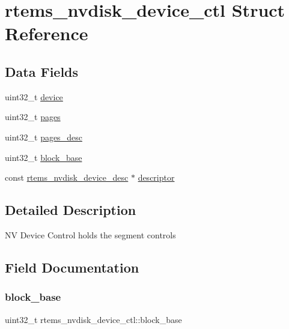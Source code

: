 \hypertarget{structrtems__nvdisk__device__ctl}{}\section{rtems\+\_\+nvdisk\+\_\+device\+\_\+ctl Struct Reference}
\label{structrtems__nvdisk__device__ctl}
\subsection*{Data Fields}
\begin{DoxyCompactItemize}
\item 
uint32\+\_\+t \mbox{\hyperlink{structrtems__nvdisk__device__ctl_a8c5bca6cf01a61e069b5372e06fe0e1f}{device}}
\item 
uint32\+\_\+t \mbox{\hyperlink{structrtems__nvdisk__device__ctl_a2ea6d757d10c0cb5cd9577aa0f3c9c3d}{pages}}
\item 
uint32\+\_\+t \mbox{\hyperlink{structrtems__nvdisk__device__ctl_a73b8ba11cb9191f6c99ae735e886b0af}{pages\+\_\+desc}}
\item 
uint32\+\_\+t \mbox{\hyperlink{structrtems__nvdisk__device__ctl_ad0a0250ea1962ab8fa3d57504726e938}{block\+\_\+base}}
\item 
const \mbox{\hyperlink{structrtems__nvdisk__device__desc}{rtems\+\_\+nvdisk\+\_\+device\+\_\+desc}} $\ast$ \mbox{\hyperlink{structrtems__nvdisk__device__ctl_a25ec08a49e1e30929fcf04c65fbdef67}{descriptor}}
\end{DoxyCompactItemize}


\subsection{Detailed Description}
NV Device Control holds the segment controls 

\subsection{Field Documentation}
\mbox{\label{structrtems__nvdisk__device__ctl_ad0a0250ea1962ab8fa3d57504726e938}} 
\subsubsection{\texorpdfstring{block\_base}{block\_base}}
{\footnotesize\ttfamily uint32\+\_\+t rtems\+\_\+nvdisk\+\_\+device\+\_\+ctl\+::block\+\_\+base}

